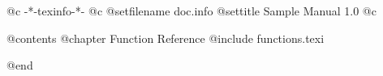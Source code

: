    @c -*-texinfo-*-
@c %
@setfilename doc.info
@settitle Sample Manual 1.0
@c %

@contents
@chapter Function Reference
@include functions.texi

@end

